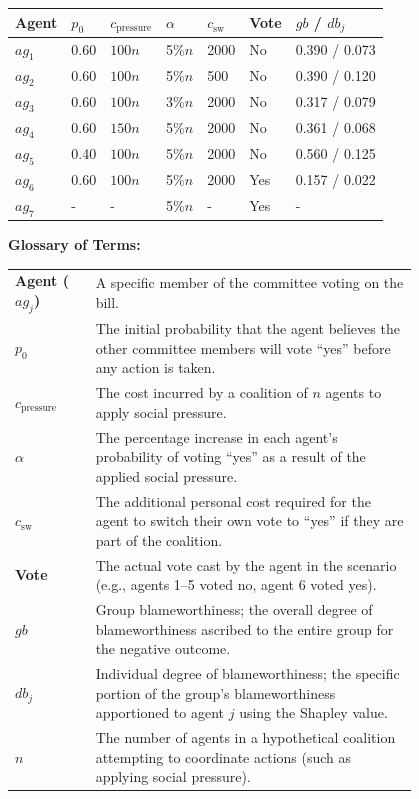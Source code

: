 \documentclass[10pt,a4paper]{article}
\begin{document}
\begin{tabular}{@{}lllllll@{}}
\toprule
Agent & $p_0$ & $c_{\text{pressure}}$ & $\alpha$ & $c_{\text{sw}}$ & Vote & $gb$ / $db_j$ \\
\midrule
$ag_1$ & 0.60 & $100n$ & 5\%$n$ & 2000 & No & 0.390 / 0.073 \\
$ag_2$ & 0.60 & $100n$ & 5\%$n$ & 500  & No & 0.390 / 0.120 \\
$ag_3$ & 0.60 & $100n$ & 3\%$n$ & 2000 & No & 0.317 / 0.079 \\
$ag_4$ & 0.60 & $150n$ & 5\%$n$ & 2000 & No & 0.361 / 0.068 \\
$ag_5$ & 0.40 & $100n$ & 5\%$n$ & 2000 & No & 0.560 / 0.125 \\
$ag_6$ & 0.60 & $100n$ & 5\%$n$ & 2000 & Yes & 0.157 / 0.022 \\
$ag_7$ & - & - & 5\%$n$ & - & Yes & - \\
\bottomrule
\end{tabular}

\vspace{1em}
\noindent \textbf{Glossary of Terms:}\\[0.5em]
\noindent
\begin{tabular}{@{}l p{0.8\linewidth}@{}}
\textbf{Agent ($ag_j$)} & A specific member of the committee voting on the bill. \\
\textbf{$p_0$} & The initial probability that the agent believes the other committee members will vote ``yes'' before any action is taken. \\
\textbf{$c_{\text{pressure}}$} & The cost incurred by a coalition of $n$ agents to apply social pressure. \\
\textbf{$\alpha$} & The percentage increase in each agent's probability of voting ``yes'' as a result of the applied social pressure. \\
\textbf{$c_{\text{sw}}$} & The additional personal cost required for the agent to switch their own vote to ``yes'' if they are part of the coalition. \\
\textbf{Vote} & The actual vote cast by the agent in the scenario (e.g., agents 1--5 voted no, agent 6 voted yes). \\
\textbf{$gb$} & Group blameworthiness; the overall degree of blameworthiness ascribed to the entire group for the negative outcome. \\
\textbf{$db_j$} & Individual degree of blameworthiness; the specific portion of the group's blameworthiness apportioned to agent $j$ using the Shapley value. \\
\textbf{$n$} & The number of agents in a hypothetical coalition attempting to coordinate actions (such as applying social pressure). \\
\end{tabular}
\end{document}
